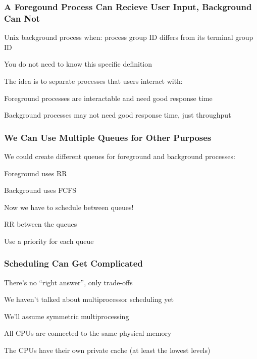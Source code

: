   \begin{frame}
    \frametitle{A Foregound Process Can Recieve User Input, Background Can Not}

    Unix background process when: process group ID differs from its terminal group ID

    \hspace{2em} You do not need to know this specific definition

    \vspace{2em}

    The idea is to separate processes that users interact with:

    \hspace{2em} Foreground processes are interactable and need good response time

    \hspace{2em} Background processes may not need good response time, just throughput
  \end{frame}

  \begin{frame}
    \frametitle{We Can Use Multiple Queues for Other Purposes}

    We could create different queues for foreground and background processes:

    \hspace{2em} Foreground uses RR

    \hspace{2em} Background uses FCFS

    \vspace{2em}

    Now we have to schedule between queues!

    \hspace{2em} RR between the queues

    \hspace{2em} Use a priority for each queue
  \end{frame}

  \begin{frame}
    \frametitle{Scheduling Can Get Complicated}

    There's no ``right answer'', only trade-offs

    \vspace{2em}

    We haven't talked about multiprocessor scheduling yet

    \vspace{2em}

    We'll assume symmetric multiprocessing

    \hspace{2em} All CPUs are connected to the same physical memory

    \hspace{2em} The CPUs have their own private cache (at least the lowest levels)
  \end{frame}

